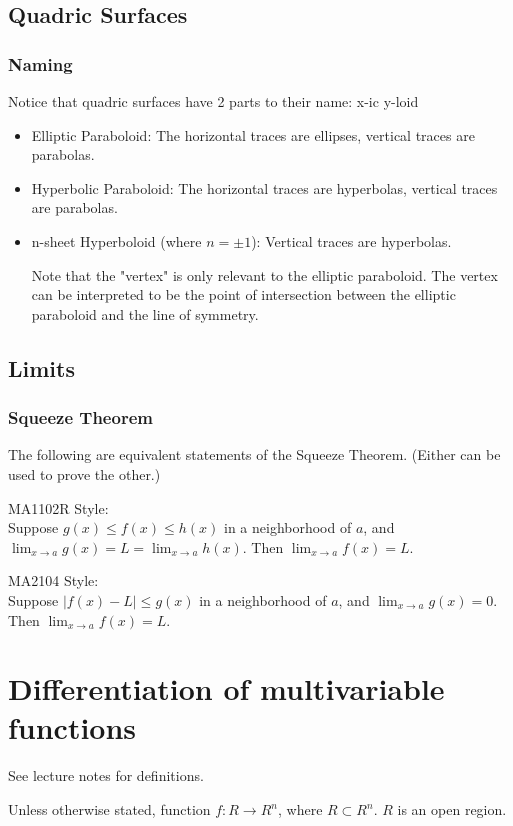 \documentclass{article}
\begin{document}
\subsection{Quadric Surfaces}
\subsubsection{Naming}
Notice that quadric surfaces have 2 parts to their name: x-ic y-loid\\
\begin{itemize}
	\item Elliptic Paraboloid: The horizontal traces are ellipses, vertical traces are parabolas.
	\item Hyperbolic Paraboloid: The horizontal traces are hyperbolas, vertical traces are parabolas. 
	\item n-sheet Hyperboloid (where $n=\pm 1$): Vertical traces are hyperbolas.
	
Note that the "vertex" is only relevant to the elliptic paraboloid. The vertex can be interpreted to be the point of intersection between the elliptic paraboloid and the line of symmetry.
\end{itemize}

\subsection{Limits}
\subsubsection{Squeeze Theorem}
The following are equivalent statements of the Squeeze Theorem. (Either can be used to prove the other.)

MA1102R Style:\\
Suppose $g(x)\leq f(x)\leq h(x)$ in a neighborhood of $a$, and $\lim_{x\rightarrow a}g(x)=L=\lim_{x\rightarrow a}h(x)$. Then $\lim_{x\rightarrow a}f(x)=L$.

MA2104 Style:\\
Suppose $|f(x)-L|\leq g(x)$ in a neighborhood of $a$, and $\lim_{x\rightarrow a}g(x)=0$. Then $\lim_{x\rightarrow a}f(x)=L$.


\section{Differentiation of multivariable functions}
See lecture notes for definitions.

Unless otherwise stated, function $f: R\rightarrow R^n$, where $R\subset R^n$. $R$ is an open region.
\end{document}
